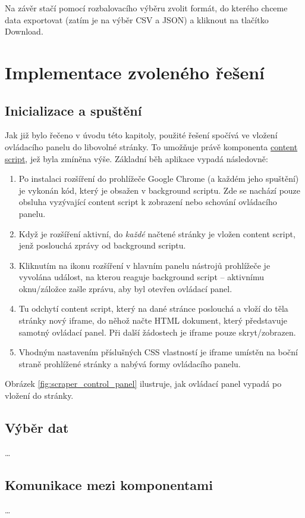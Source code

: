 \documentclass[thesis=B,czech]{FITthesis}[2012/06/26]
\begin{document}
Na závěr stačí pomocí rozbalovacího výběru zvolit formát, do kterého chceme data exportovat (zatím je na výběr CSV a JSON) a kliknout na tlačítko \textsf{Download}.

\section{Implementace zvoleného řešení}
\subsection{Inicializace a spuštění}
Jak již bylo řečeno v úvodu této kapitoly, použité řešení spočívá ve vložení ovládacího panelu do libovolné stránky. To umožňuje právě komponenta \hyperref[def:content_script]{content script}, jež byla zmíněna výše. Základní běh aplikace vypadá následovně:
\begin{enumerate}
	\item Po instalaci rozšíření do prohlížeče Google Chrome (a každém jeho spuštění) je vykonán kód, který je obsažen v background scriptu. Zde se nachází pouze obsluha vyzývající content script k zobrazení nebo schování ovládacího panelu.
	\item Když je rozšíření aktivní, do \emph{každé} načtené stránky je vložen content script, jenž poslouchá zprávy od background scriptu.
	\item Kliknutím na ikonu rozšíření v hlavním panelu nástrojů prohlížeče je vyvolána událost, na kterou reaguje background script -- aktivnímu oknu/záložce zašle zprávu, aby byl otevřen ovládací panel. 
	\item Tu odchytí content script, který na dané stránce poslouchá a vloží do těla stránky nový iframe, do něhož načte HTML dokument, který představuje samotný ovládací panel. Při další žádostech je iframe pouze skryt/zobrazen.
	\item Vhodným nastavením příslušných CSS vlastností je iframe umístěn na boční straně prohlížené stránky a nabývá formy ovládacího panelu. 
\end{enumerate}
Obrázek \ref{fig:scraper_control_panel} ilustruje, jak ovládací panel vypadá po vložení do stránky.

\subsection{Výběr dat}
\dots

\subsection{Komunikace mezi komponentami}
\dots
\end{document}
